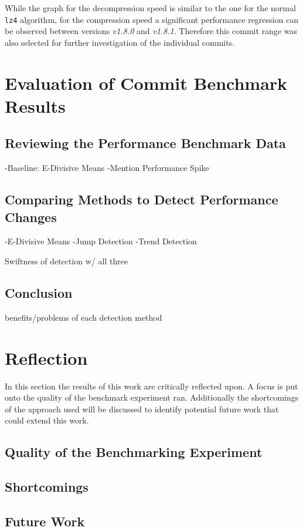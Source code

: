 \documentclass[	runningheads,
				a4paper]{llncs}
\begin{document}
	While the graph for the decompression speed is similar to the one for the normal \texttt{lz4} algorithm, for the compression speed a significant performance regression can be observed between versions \textit{v1.8.0} and \textit{v1.8.1}. Therefore this commit range was also selected for further investigation of the individual commits.

\section{Evaluation of Commit Benchmark Results}
\label{sec:exp_evaluation}

\subsection{Reviewing the Performance Benchmark Data}
-Baseline: E-Divisive Means
-Mention Performance Spike

\subsection{Comparing Methods to Detect Performance Changes}
-E-Divisive Means
-Jump Detection
-Trend Detection

Swiftness of detection w/ all three

\subsection{Conclusion}
benefits/problems of each detection method


\section{Reflection}
In this section the results of this work are critically reflected upon. A focus is put onto the quality of the benchmark experiment ran. Additionally the shortcomings of the approach used will be discussed to identify potential future work that could extend this work.

	\subsection{Quality of the Benchmarking Experiment}


	\subsection{Shortcomings}

	\subsection{Future Work}
\end{document}
